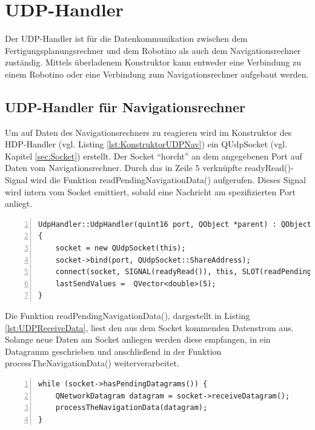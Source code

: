 \section{UDP-Handler} 
\label{sec:UdpHandler}

Der UDP-Handler ist für die Datenkommunikation zwischen dem Fertigungsplanungsrechner und dem Robotino als auch dem Navigationsrechner zuständig. Mittels überladenem Konstruktor kann entweder eine Verbindung zu einem Robotino oder eine Verbindung zum Navigationsrechner aufgebaut werden. 

\subsection{UDP-Handler für Navigationsrechner}

Um auf Daten des Navigationsrechners zu reagieren wird im Konstruktor des HDP-Handler (vgl. Listing \ref{lst:KonstruktorUDPNav}) ein QUdpSocket (vgl. Kapitel \ref{sec:Socket}) erstellt. Der Socket "`horcht"' an dem angegebenen Port auf Daten vom Navigationsrechner. Durch das in Zeile 5 verknüpfte readyRead()-Signal wird die Funktion readPendingNavigationData() aufgerufen. Dieses Signal wird intern vom Socket emittiert, sobald eine Nachricht am spezifizierten Port anliegt. 

\begin{lstlisting}[frame=single, breaklines=true, numbers=left, stepnumber=2, firstnumber=1, numberstyle = \tiny, caption=UDP-Handler Konstruktor für Navigationsdatenaustausch,label=lst:KonstruktorUDPNav]
UdpHandler::UdpHandler(quint16 port, QObject *parent) : QObject(parent)
{
    socket = new QUdpSocket(this);
    socket->bind(port, QUdpSocket::ShareAddress);
    connect(socket, SIGNAL(readyRead()), this, SLOT(readPendingNavigationData()));
    lastSendValues =  QVector<double>(5);
}
\end{lstlisting}

Die Funktion readPendingNavigationData(), dargestellt in Listing \ref{lst:UDPReceiveData}, liest den aus dem Socket kommenden Datenstrom aus. Solange neue Daten am Socket anliegen werden diese empfangen, in ein Datagramm geschrieben und anschließend in der Funktion processTheNavigationData() weiterverarbeitet. 

\begin{lstlisting}[frame=single, breaklines=true, numbers=left, stepnumber=2, firstnumber=1, numberstyle = \tiny, caption=Daten über UDP empfangen,label=lst:UDPReceiveData]
while (socket->hasPendingDatagrams()) {
    QNetworkDatagram datagram = socket->receiveDatagram();
    processTheNavigationData(datagram);
}
\end{lstlisting}

